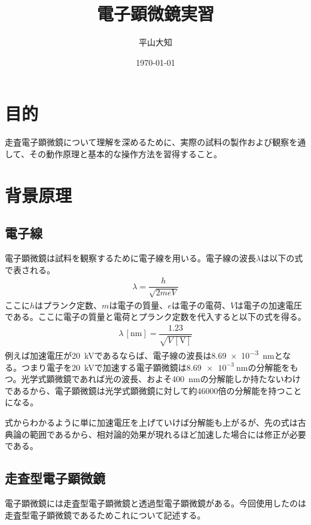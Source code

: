 \documentclass[titlepage,fontsize=10.5pt]{jlreq}
\begin{document}
\title{電子顕微鏡実習}
\author{平山大知}
\date{\today}
\maketitle

\tableofcontents
\clearpage

\section{目的} %
    \label{sec.目的}
    走査電子顕微鏡について理解を深めるために、実際の試料の製作および観察を通して、その動作原理と基本的な操作方法を習得すること。
\section{背景原理} %
    \label{sec.背景原理}
    
    \subsection{電子線} %
    \label{sub:電子線}
    電子顕微鏡は試料を観察するために電子線を用いる。電子線の波長$\lambda$は以下の式で表される。
    \begin{align}
        \lambda = \dfrac{h}{\sqrt{2meV}}
    \end{align}
    ここに$h$はプランク定数、$m$は電子の質量、$e$は電子の電荷、$V$は電子の加速電圧である。ここに電子の質量と電荷とプランク定数を代入すると以下の式を得る。
    \begin{align}
        \lambda \,[\unit{\nano\metre}]= \dfrac{1.23}{\sqrt{V\,[\unit{\volt}]}}
    \end{align}
    例えば加速電圧が\qty{20}{\kilo\volt}であるならば、電子線の波長は\qty{8.69e-3}{\nano\metre}となる。つまり電子を\qty{20}{\kilo\volt}で加速する電子顕微鏡は$\qty{8.69e-3}{\nano\metre}$の分解能をもつ。光学式顕微鏡であれば光の波長、およそ\qty{400}{\nano\metre}の分解能しか持たないわけであるから、電子顕微鏡は光学式顕微鏡に対して約$46000$倍の分解能を持つことになる。

    式からわかるように単に加速電圧を上げていけば分解能も上がるが、先の式は古典論の範囲であるから、相対論的効果が現れるほど加速した場合には修正が必要である。

    \subsection{走査型電子顕微鏡} %
    \label{sub:走査型電子顕微鏡}
    電子顕微鏡には走査型電子顕微鏡と透過型電子顕微鏡がある。今回使用したのは走査型電子顕微鏡であるためこれについて記述する。
\end{document}
